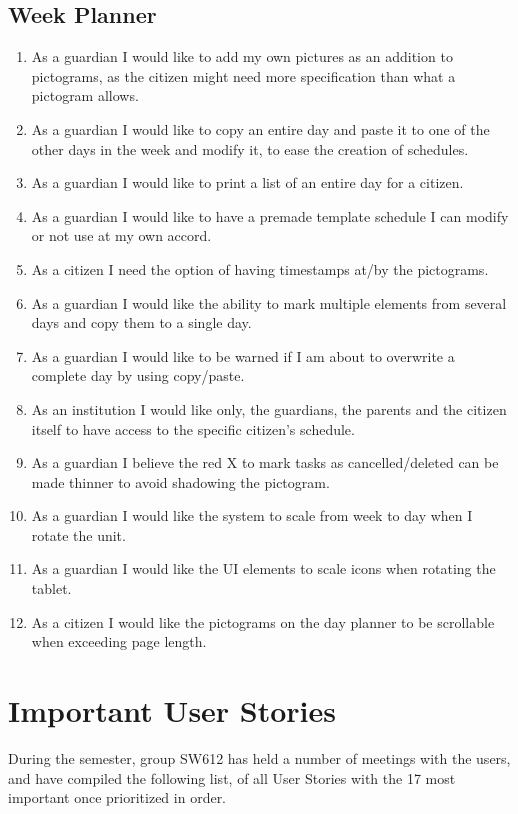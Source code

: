 \subsection*{Week Planner}
\begin{enumerate}
  \setlength\itemsep{0em}
  \item As a guardian I would like to add my own pictures as an addition to pictograms, as the citizen might need more specification than what a pictogram allows.
  \item As a guardian I would like to copy an entire day and paste it to one of the other days in the week and modify it, to ease the creation of schedules.
  \item As a guardian I would like to print a list of an entire day for a citizen.
  \item As a guardian I would like to have a premade template schedule I can modify or not use at my own accord.
  \item As a citizen I need the option of having timestamps at/by the pictograms.
  \item As a guardian I would like the ability to mark multiple elements from several days and copy them to a single day.
  \item As a guardian I would like to be warned if I am about to overwrite a complete day by using copy/paste.
  \item As an institution I would like only, the guardians, the parents and the citizen itself to have access to the specific citizen’s schedule.
  \item As a guardian I believe the red X to mark tasks as cancelled/deleted can be made thinner to avoid shadowing the pictogram.
  \item As a guardian I would like the system to scale from week to day when I rotate the unit.
  \item As a guardian I would like the UI elements to scale icons when rotating the tablet.
  \item As a citizen I would like the pictograms on the day planner to be scrollable when exceeding page length.
\end{enumerate}

\section{Important User Stories}\label{ImportantUS}
During the semester, group SW612 has held a number of meetings with the users,
and have compiled the following list, of all User Stories with the 17 most
important once prioritized in order.

